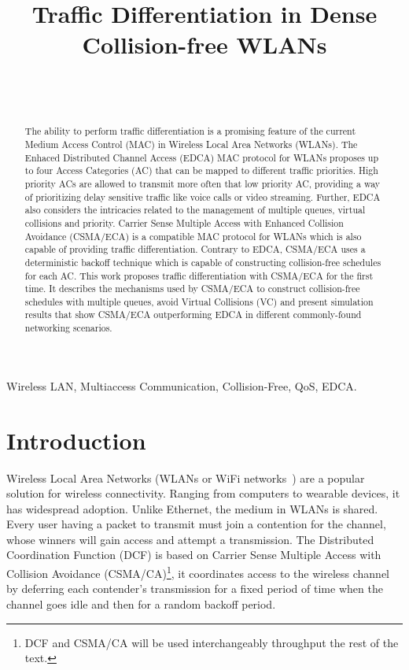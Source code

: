 \documentclass[a4paper,journal]{IEEEtran}
\title{Traffic Differentiation in Dense Collision-free WLANs}
\author{\IEEEauthorblockN{Luis Sanabria-Russo\IEEEauthorrefmark{0}, Boris Bellalta\IEEEauthorrefmark{0}}\\
      \IEEEauthorblockA{\IEEEauthorrefmark{0}Department of Information and Communication Technologies \\ Universitat Pompeu Fabra, Barcelona, Spain
      \\\ {\tt \{luis.sanabria,boris.bellalta\}@upf.edu}}\\
  }
\begin{document}
\maketitle

\begin{abstract}
The ability to perform traffic differentiation is a promising feature of the current Medium Access Control (MAC) in Wireless Local Area Networks (WLANs). The Enhaced Distributed Channel Access (EDCA) MAC protocol for WLANs proposes up to four Access Categories (AC) that can be mapped to different traffic priorities. High priority ACs are allowed to transmit more often that low priority AC, providing a way of prioritizing delay sensitive traffic like voice calls or video streaming. Further, EDCA also considers the intricacies related to the management of multiple queues, virtual collisions and priority. Carrier Sense Multiple Access with Enhanced Collision Avoidance (CSMA/ECA) is a compatible MAC protocol for WLANs which is also capable of providing traffic differentiation. Contrary to EDCA, CSMA/ECA uses a deterministic backoff technique which is capable of constructing collision-free schedules for each AC. This work proposes traffic differentiation with CSMA/ECA for the first time. It describes the mechanisms used by CSMA/ECA to construct collision-free schedules with multiple queues, avoid Virtual Collisions (VC) and present simulation results that show CSMA/ECA outperforming EDCA in different commonly-found networking scenarios.
\end{abstract}

\begin{IEEEkeywords}
Wireless LAN, Multiaccess Communication, Collision-Free, QoS, EDCA.
\end{IEEEkeywords}

\section{Introduction}
Wireless Local Area Networks (WLANs or WiFi networks~\cite{802Standards}) are a popular solution for wireless connectivity. Ranging from computers to wearable devices, it has widespread adoption. Unlike Ethernet, the medium in WLANs is shared. Every user having a packet to transmit must join a contention for the channel, whose winners will gain access and attempt a transmission. The Distributed Coordination Function (DCF) is based on Carrier Sense Multiple Access with Collision Avoidance (CSMA/CA)\footnote{DCF and CSMA/CA will be used interchangeably throughput the rest of the text.}, it coordinates access to the wireless channel by deferring each contender's transmission for a fixed period of time when the channel goes idle and then for a random backoff period.
\end{document}
